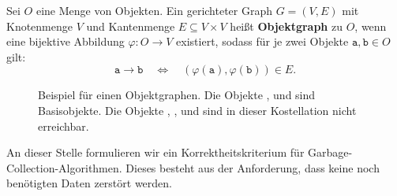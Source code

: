 	
\begin{mybox}
\begin{defn}[Objektgraph]
	Sei $O$ eine Menge von Objekten.
	Ein gerichteter Graph $G = (V,E)$ mit Knotenmenge $V$ und Kantenmenge $E \subseteq V \times V$ heißt \textbf{Objektgraph} zu $O$, wenn eine bijektive Abbildung $\varphi \colon O \rightarrow V$ existiert, sodass für je zwei Objekte $\mathtt{a,b} \in O$ gilt:
	\[
		\mathtt{a} \rightarrow \mathtt{b} \quad \Leftrightarrow \quad (\varphi(\mathtt{a}),\varphi(\mathtt{b})) \in E.
	\]
\end{defn}
\end{mybox}



\begin{figure}[h]
	\centering
	
	\caption[Beispiel für einen Objektgraphen]{Beispiel für einen Objektgraphen. Die Objekte ,  und  sind Basisobjekte. Die Objekte , ,  und  sind in dieser Kostellation nicht erreichbar.}
\end{figure}

An dieser Stelle formulieren wir ein Korrektheitskriterium für Garbage-Collection-Algorithmen.
Dieses besteht aus der Anforderung, dass keine noch benötigten Daten zerstört werden.

